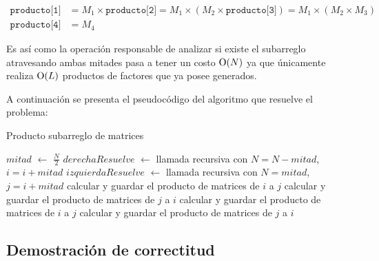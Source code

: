 \begin{align*}
	\texttt{producto[1]} &= M_1 \times \texttt{producto[2]} =
	M_1 \times \left(M_2 \times \texttt{producto[3]}\right) =
	M_1 \times \left(M_2 \times M_3\right) \\
	\texttt{producto[4]} &= M_4
\end{align*}

Es así como la operación responsable de analizar si existe el subarreglo
atravesando ambas mitades pasa a tener un costo $\operatorname{O}(N)$ ya que únicamente
realiza $\operatorname{O}(L)$ productos de factores que ya posee generados.

A continuación se presenta el pseudocódigo del algoritmo que resuelve el problema:

\begin{algorithm}[H]
	\caption{Producto subarreglo de matrices}
	 {
		 {
			 \;
		}
	}
	{
		 {
			$mitad$ $\gets$ $\frac{N}{2}$ \;
			$derechaResuelve$ $\gets$ llamada recursiva con $N = N - mitad$, $i =
			i + mitad$ \;
			$izquierdaResuelve$ $\gets$ llamada recursiva con $N = mitad$, $j = i
			+ mitad$ \;
			 {
				 \;
			}
			{
				 {
					 \;
				}
				{
					 {
						calcular y guardar el producto de matrices de $i$ a $j$ \;
					}
					{
						calcular y guardar el producto de matrices de $j$ a $i$ \;
					}
				}
			}
		}
		{
			 {
				calcular y guardar el producto de matrices de $i$ a $j$ \;
			}
			{
				calcular y guardar el producto de matrices de $j$ a $i$ \;
			}
		}
	}

	 \;
\end{algorithm}

\subsection{Demostración de correctitud}


